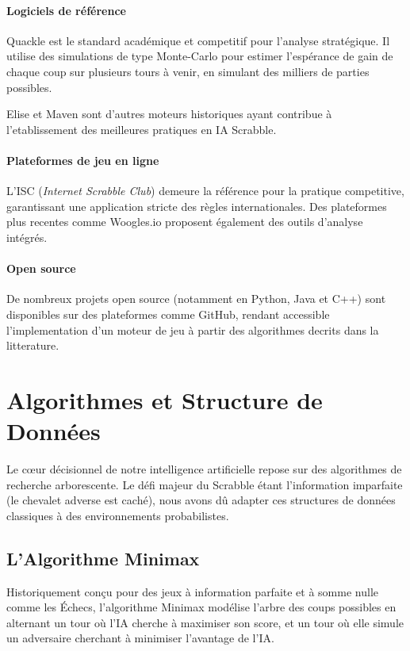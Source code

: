 \documentclass[a4paper]{article}
\begin{document}
	\paragraph{Logiciels de référence}
    Quackle \cite{sheppard2006} est le standard académique et competitif pour l'analyse stratégique. Il utilise des simulations de type Monte-Carlo pour estimer l'espérance de gain de chaque coup sur plusieurs tours à venir, en simulant des milliers de parties possibles.

	Elise et Maven sont d'autres moteurs historiques ayant contribue à l'etablissement des meilleures pratiques en IA Scrabble.

	\paragraph{Plateformes de jeu en ligne}
	L'ISC (\textit{Internet Scrabble Club}) demeure la référence pour la pratique competitive, garantissant une application stricte des règles internationales. Des plateformes plus recentes comme Woogles.io proposent également des outils d'analyse intégrés.

	\paragraph{Open source}
	De nombreux projets open source (notamment en Python, Java et C++) sont disponibles sur des plateformes comme GitHub, rendant accessible l'implementation d'un moteur de jeu à partir des algorithmes decrits dans la litterature.


  



	\section{Algorithmes et Structure de Données}

    Le cœur décisionnel de notre intelligence artificielle repose sur des algorithmes de recherche arborescente. Le défi majeur du Scrabble étant l'information imparfaite (le chevalet adverse est caché), nous avons dû adapter ces structures de données classiques à des environnements probabilistes.

    \subsection{L'Algorithme Minimax}

    Historiquement conçu pour des jeux à information parfaite et à somme nulle comme les Échecs, l'algorithme Minimax modélise l'arbre des coups possibles en alternant un tour où l'IA cherche à maximiser son score, et un tour où elle simule un adversaire cherchant à minimiser l'avantage de l'IA.
\end{document}
